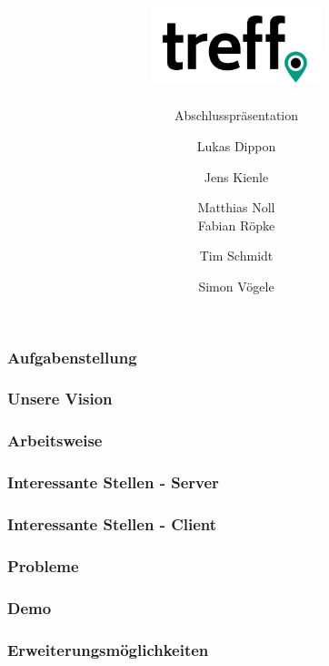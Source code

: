\documentclass[aspectratio=1610]{beamer}
\title{\includegraphics[width = 50mm]{images/logo_crop.png}}
\subtitle{\huge Abschlusspräsentation}
\author{Lukas Dippon
	\and Jens Kienle
	\and Matthias Noll
    \\Fabian Röpke
	\and Tim Schmidt
	\and Simon Vögele}
\begin{document}
	\begin{frame}[plain]
	\maketitle
	\end{frame}


	\begin{frame}[plain]
      \frametitle{\textbf{Aufgabenstellung}}

  \end{frame}

  \begin{frame}[plain]
      \frametitle{\textbf{Unsere Vision}}
  \end{frame}


  \begin{frame}[plain]
      \frametitle{\textbf{Arbeitsweise}}

  \end{frame}

  \begin{frame}[plain]
      \frametitle{\textbf{Interessante Stellen - Server}}
  \end{frame}

  \begin{frame}[plain]
      \frametitle{\textbf{Interessante Stellen - Client}}
  \end{frame}

  \begin{frame}[plain]
      \frametitle{\textbf{Probleme}}
  \end{frame}


  \begin{frame}[plain]
      \frametitle{\textbf{Demo}}

  \end{frame}

  \begin{frame}[plain]
      \frametitle{\textbf{Erweiterungsmöglichkeiten}}
  \end{frame}
\end{document}

